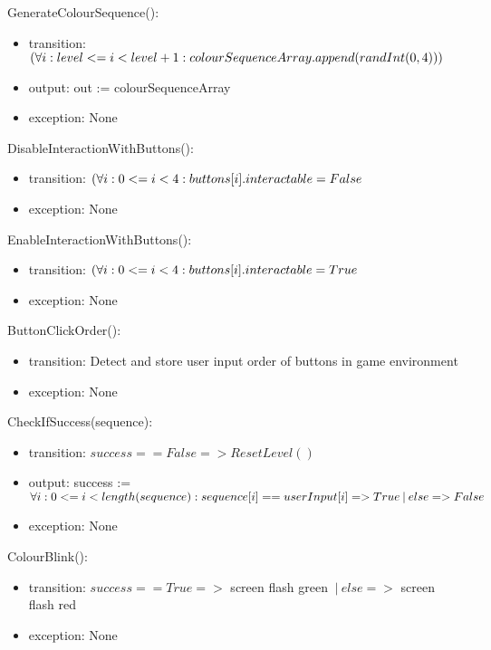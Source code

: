 \documentclass[12pt, titlepage]{article}
\begin{document}
\noindent GenerateColourSequence():
\begin{itemize}
\item transition: $ (\forall i: level <= i < level + 1 : \newline colourSequenceArray.append(randInt(0,4)))$
\item output: out := colourSequenceArray
\item exception: None
\end{itemize}

\noindent DisableInteractionWithButtons():
\begin{itemize}
\item transition: $ (\forall i: 0 <= i < 4 : \newline buttons[i].interactable = False$
\item exception: None
\end{itemize}

\noindent EnableInteractionWithButtons():
\begin{itemize}
\item transition: $ (\forall i: 0 <= i < 4 : \newline buttons[i].interactable = True$
\item exception: None
\end{itemize}

\noindent ButtonClickOrder():
\begin{itemize}
\item transition: Detect and store user input order of buttons in game environment
\item exception: None
\end{itemize}

\noindent CheckIfSuccess(sequence):
\begin{itemize}
\item transition: $success == False => ResetLevel()$
\item output: success := $ \forall i: 0 <= i < length(sequence) : \newline sequence[i] == userInput[i] => True  \: | \: else => False$
\item exception: None
\end{itemize}

\noindent ColourBlink():
\begin{itemize}
\item transition: $success == True =>$ screen flash green $\: | \: else =>$ screen flash red
\item exception: None
\end{itemize}
\end{document}
